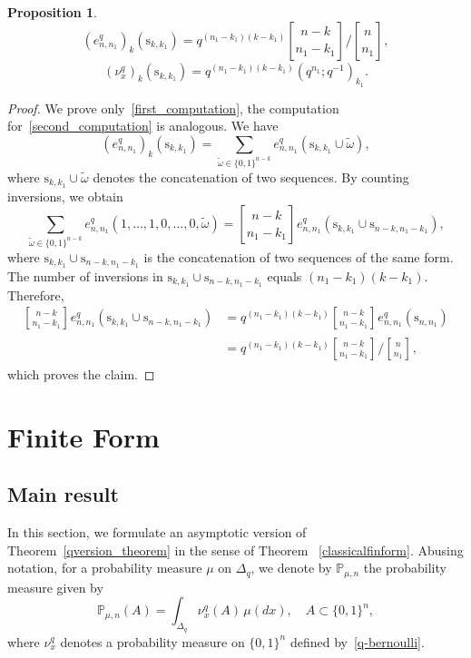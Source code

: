 \documentclass[12pt, a4paper]{amsart}
\numberwithin{equation}{subsection}
\newtheorem{prop}[equation]{Proposition}
\theoremstyle{definition}
\newcommand{\qbinom}[3]{\genfrac{[}{]}{0pt}{}{#1}{#2}_{#3}}
\newcommand{\bP}{{\mathbb P}}
\begin{document}
\begin{prop}\label{computation_prop}
\begin{equation}\label{first_computation}
(e^{q}_{n, n_1})_{k} \left(\text{s}_{k,k_{1}}\right) = q^{(n_{1} - k_{1})(k-k_{1})}\qbinom{n-k}{n_{1}-k_{1}}{} \bigg/ \qbinom{n}{n_{1}}{},
\end{equation}
\begin{equation}\label{second_computation}
(\nu^{q}_{x})_{k}  \left(\text{s}_{k,k_{1}}\right) = q^{(n_{1} - k_{1})(k-k_{1})}(q^{n_{1}}; q^{-1})_{k_{1}}.
\end{equation}
\end{prop}
\begin{proof}

We prove only~\eqref{first_computation}, the computation for~\eqref{second_computation} is analogous.
We have
\begin{equation*}
(e^{q}_{n, n_1})_{k} \left(\text{s}_{k,k_{1}}\right) = \sum_{\tilde{\omega} \in \{0,1\}^{n-k}} e^{q}_{n, n_1} \left(\text{s}_{k,k_{1}} \cup \tilde{\omega} \right),
\end{equation*}
where \( \text{s}_{k,k_{1}} \cup \tilde{\omega} \) denotes the concatenation of two sequences.
By counting inversions, we obtain
\begin{equation*}
\sum_{\tilde{\omega} \in \{0,1\}^{n-k}} e^{q}_{n, n_1} (1,\ldots,1,0,\ldots,0, \tilde{\omega}) 
=  \qbinom{n-k}{n_{1}-k_{1}}{}  e^{q}_{n, n_1} \left(\text{s}_{k, k_{1}} \cup \text{s}_{n-k, n_{1}-k_{1}}\right),
\end{equation*}
where \( \text{s}_{k,k_{1}} \cup \text{s}_{n-k,n_{1}-k_{1}} \) is the concatenation of two sequences of the same form.
The number of inversions in \( \text{s}_{k,k_{1}} \cup \text{s}_{n-k,n_{1}-k_{1}} \) equals \( (n_{1} - k_{1})(k - k_{1}) \). Therefore,
\begin{align*}
\qbinom{n-k}{n_{1}-k_{1}}{}  e^{q}_{n, n_1} \left(\text{s}_{k, k_{1}} \cup \text{s}_{n-k, n_{1}-k_{1}}\right)
&= q^{(n_{1}-k_{1})(k-k_{1})} \qbinom{n-k}{n_{1}-k_{1}}{} e^{q}_{n, n_1} \left(\text{s}_{n,n_{1}}\right) \\
&= q^{(n_{1}-k_{1})(k-k_{1})} \qbinom{n-k}{n_{1}-k_{1}}{} \bigg/ \qbinom{n}{n_{1}}{},
\end{align*}
which proves the claim.
\end{proof}
\section{Finite Form}
\subsection{Main result} In this section, we formulate an asymptotic version of Theorem~\eqref{qversion_theorem} in the sense of Theorem ~\eqref{classicalfinform}. Abusing notation, for a probability measure $\mu$ on $\Delta_q$, we denote by $\bP_{\mu,n}$ the probability measure given by
\[
\bP_{\mu,n}(A) = \int_{\Delta_q} \nu^{q}_{x}(A) \, \mu(dx), \quad A \subset \{0,1\}^{n},
\]
where $\nu^{q}_{x}$ denotes a probability measure on $\{0,1\}^{n}$ defined by~\eqref{q-bernoulli}.
\end{document}
